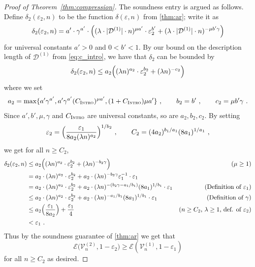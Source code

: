 \documentclass[11pt]{article}
\theoremstyle{definition}
\newcommand{\eps}{\varepsilon}
\newcommand{\decider}{\mathcal{D}}
\newcommand{\verifier}{\mathcal{V}}
\newcommand{\gamestyle}[1]{\ensuremath{\textsc{#1}}\xspace}
\newcommand{\intro}{\gamestyle{Intro}}
\newcommand{\Ent}{\mathscr{E}}
\begin{document}
\begin{proof}[Proof of Theorem~\ref{thm:compression}]
The soundness entry is argued as follows. Define $\delta_2(\eps_2,n)$ to be the function $\delta(\eps,n)$ from \cref{thm:ar}; write it as \begin{equation}\label{eq:lambda2-15}
    \delta_2(\eps_2, n) = a' \cdot \gamma^{a'} \cdot \Bigl( (\lambda \cdot |\decider^{(1)}| \cdot n)^{\mu a'} \cdot \eps_2^{b'} +
    (\lambda \cdot |\decider^{(1)}| \cdot n)^{-\mu b' \gamma} \Bigr)
  \end{equation}
	for universal constants $a' > 0$ and $0< b' < 1$. By our bound on the description length of $\decider^{(1)}$ from \cref{eq:c_intro}, we have that $\delta_2$ can be bounded by
  \begin{align*}
  	\delta_2(\eps_2, n) \leq a_2 \Bigl( (\lambda  n)^{a_2} \cdot \eps_2^{b_2} +
    (\lambda n)^{-c_2} \Bigr)
  \end{align*}
  where we set 
  \begin{equation}
  \label{eq:re-b-2} 
  	a_2 = \max \{ a' \gamma^{a'}, a' \gamma^{a'} (C_\intro)^{\mu a'}, (1+C_\intro) \mu a' \} ~, \qquad b_2 = b' ~, \qquad c_2= \mu b' \gamma~.
\end{equation}
Since $a',b',\mu,\gamma$ and $C_\intro$ are universal constants, so are $a_2,b_2,c_2$. 
    By setting
  \begin{equation}
  \label{eq:re-eps-2}
  	\eps_2 = \Bigl(\frac{\eps_1}{8a_2(\lambda n)^{a_2}}\Bigr)^{1/b_2}~, \qquad C_2 = (4a_2)^{b_1/a_1} (8a_1)^{1/a_1}~,
  \end{equation}   
  we get for all $n \geq C_2$, 
  \begin{align*}
      \delta_2(\eps_2, n) & \leq a_2 \Bigl( (\lambda n)^{a_2} \cdot \eps_2^{b_2} + (\lambda
      n)^{-b_2 \gamma} \Bigr) & \text{($\mu \geq 1$)}\\
      & = a_2 \cdot (\lambda n)^{a_2} \cdot \eps_2^{b_2} + a_2 \cdot (\lambda
      n)^{-b_2 \gamma } \eps_1^{-1} \cdot \eps_1\\
      & = a_2 \cdot (\lambda n)^{a_2} \cdot \eps_2^{b_2} + a_2 \cdot (\lambda
      n)^{-(b_2 \gamma - a_1/b_1)} (8a_1)^{1/b_1} \cdot \eps_1 & \text{(Definition of $\eps_1$)}\\
      & \leq a_2 \cdot (\lambda n)^{a_2} \cdot \eps_2^{b_2} + a_2 \cdot (\lambda
      n)^{-a_1/b_1} (8a_1)^{1/b_1} \cdot \eps_1 & \text{(Definition of $\gamma$)} \\
      & \le a_2 \Bigl( \frac{\eps_1}{8 a_2} \Bigr) + \frac{\eps_1}{4} & \text{($n \geq C_2$, $\lambda \geq 1$, def. of $\eps_2$)} \\
      & < \eps_1~.
  \end{align*}
Thus by the soundness guarantee of \cref{thm:ar} we get that
  \[
  	\Ent \big(
    \verifier_n^{(2)}, 1 - \eps_2 \big) \geq \Ent(\verifier_n^{(1)}, 1 - \eps_1)
  \]
  for all $n \geq C_2$ as desired.  
  	




\end{proof}
\end{document}
